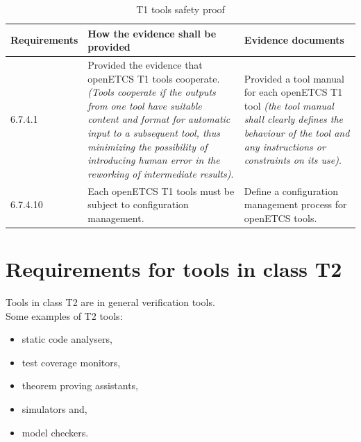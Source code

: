 \documentclass{template/openetcs_report}
\begin{document}
{\footnotesize\sffamily\centering
\begin{longtable}{|p{2cm}|p{9cm}|p{3cm}|}
\caption{T1 tools safety proof}\\
\hline
\bfseries Requirements & \bfseries How the evidence shall be provided & \bfseries Evidence documents\\
\hline
\hline
\endhead
\hline
\endfoot

6.7.4.1 & Provided the evidence that openETCS T1 tools cooperate. \linebreak \linebreak \textit{(Tools cooperate if the outputs from one tool have suitable content and format for automatic input to a subsequent tool, thus minimizing the possibility of introducing human error in the reworking of intermediate results)}. & Provided a tool manual for each openETCS T1 tool \linebreak \linebreak \textit{(the tool manual shall clearly defines the behaviour of the tool and any instructions or constraints on its use)}. \\ 
\hline
6.7.4.10 & Each openETCS T1 tools must be subject to configuration management. & Define a configuration management process for openETCS tools.\\ 
\hline
\end{longtable}}


\section{Requirements for tools in class T2}
\label{T2}
Tools in class T2 are in general verification tools.\\
Some examples of T2 tools:
\begin{itemize}\itemsep=0pt
  \item static code analysers,
  \item test coverage monitors,
  \item theorem proving assistants,
  \item simulators and,
  \item model checkers.
\end{itemize}
\end{document}
